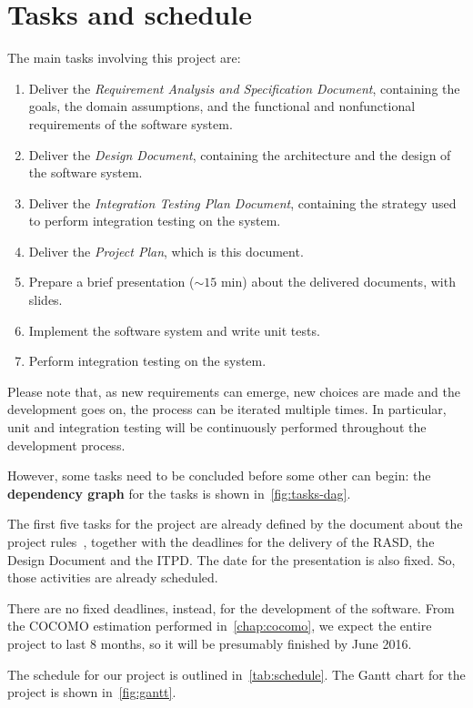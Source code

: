 \chapter{Tasks and schedule}
\label{chap:tasks}

The main tasks involving this project are:
\begin{enumerate}
    \item Deliver the \emph{Requirement Analysis and Specification Document}, containing the goals, the domain assumptions, and the functional and nonfunctional requirements of the software system.
    \item Deliver the \emph{Design Document}, containing the architecture and the design of the software system.
    \item Deliver the \emph{Integration Testing Plan Document}, containing the strategy used to perform integration testing on the system.
    \item Deliver the \emph{Project Plan}, which is this document.
    \item Prepare a brief presentation ($\sim 15$ min) about the delivered documents, with slides.
    \item Implement the software system and write unit tests.
    \item Perform integration testing on the system.
\end{enumerate}

Please note that, as new requirements can emerge, new choices are made and the development goes on, the process can be iterated multiple times. In particular, unit and integration testing will be continuously performed throughout the development process.

However, some tasks need to be concluded before some other can begin: the \textbf{dependency graph} for the tasks is shown in~\autoref{fig:tasks-dag}.

The first five tasks for the project are already defined by the document about the project rules~\cite{se-project-rules}, together with the deadlines for the delivery of the RASD, the Design Document and the ITPD. The date for the presentation is also fixed.
So, those activities are already scheduled.

There are no fixed deadlines, instead, for the development of the software. From the COCOMO estimation performed in~\autoref{chap:cocomo}, we expect the entire project to last 8 months, so it will be presumably finished by June 2016.

The schedule for our project is outlined in~\autoref{tab:schedule}. The Gantt chart for the project is shown in~\autoref{fig:gantt}.

